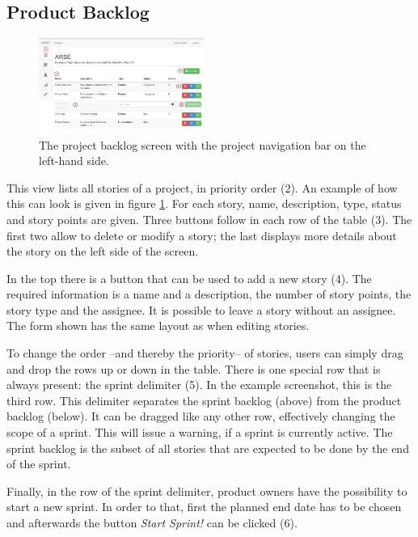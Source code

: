 \documentclass[
	accentcolor=tud1a %
]{tudreport}
\begin{document}
\subsection{Product Backlog}
\label{sec:backlog}


\begin{figure}
	\centering
	\includegraphics[width=0.48\textwidth]{img/backlog}
	\caption{The project backlog screen with the project navigation bar on the left-hand side.}
	\label{fig:project-backlog}
\end{figure}

This view lists all stories of a project, in priority order (2). An example of how this can look is given in figure \ref{fig:project-backlog}. For each story, name, description, type, status and story points are given. Three buttons follow in each row of the table (3). The first two allow to delete or modify a story; the last displays more details about the story on the left side of the screen.

In the top there is a button that can be used to add a new story (4). The required information is a name and a description, the number of story points, the story type and the assignee. It is possible to leave a story without an assignee. The form shown has the same layout as when editing stories.

To change the order --and thereby the priority-- of stories, users can simply drag and drop the rows up or down in the table. There is one special row that is always present: the sprint delimiter (5). In the example screenshot, this is the third row. This delimiter separates the sprint backlog (above) from the product backlog (below). It can be dragged like any other row, effectively changing the scope of a sprint. This will issue a warning, if a sprint is currently active. The sprint backlog is the subset of all stories that are expected to be done by the end of the sprint.

Finally, in the row of the sprint delimiter, product owners have the possibility to start a new sprint. In order to that, first the planned end date has to be chosen and afterwards the button \emph{Start Sprint!} can be clicked (6).
\end{document}

